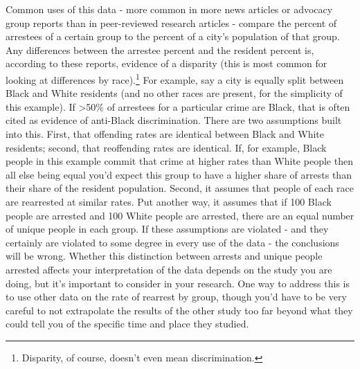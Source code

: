 \documentclass[
]{krantz}
\begin{document}
Common uses of this data - more common in more news articles
or advocacy group reports than in peer-reviewed research
articles - compare the percent of arrestees of a certain
group to the percent of a city's population of that group.
Any differences between the arrestee percent and the
resident percent is, according to these reports, evidence of
a disparity (this is most common for looking at differences
by race).\footnote{Disparity, of course, doesn't even mean
  discrimination.} For example, say a city is equally split
between Black and White residents (and no other races are
present, for the simplicity of this example). If
\textgreater50\% of arrestees for a particular crime are
Black, that is often cited as evidence of anti-Black
discrimination. There are two assumptions built into this.
First, that offending rates are identical between Black and
White residents; second, that reoffending rates are
identical. If, for example, Black people in this example
commit that crime at higher rates than White people then all
else being equal you'd expect this group to have a higher
share of arrests than their share of the resident
population. Second, it assumes that people of each race are
rearrested at similar rates. Put another way, it assumes
that if 100 Black people are arrested and 100 White people
are arrested, there are an equal number of unique people in
each group. If these assumptions are violated - and they
certainly are violated to some degree in every use of the
data - the conclusions will be wrong. Whether this
distinction between arrests and unique people arrested
affects your interpretation of the data depends on the study
you are doing, but it's important to consider in your
research. One way to address this is to use other data on
the rate of rearrest by group, though you'd have to be very
careful to not extrapolate the results of the other study
too far beyond what they could tell you of the specific time
and place they studied.
\end{document}
